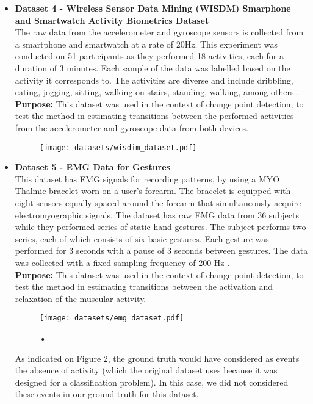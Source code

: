 \begin{itemize}
\item \textbf{Dataset 4 - Wireless Sensor Data Mining (WISDM) Smarphone and Smartwatch Activity Biometrics Dataset}\\
The raw data from the accelerometer and gyroscope sensors is collected from a smartphone and smartwatch at a rate of 20Hz. This experiment was conducted on 51 participants as they performed 18 activities, each for a duration of 3 minutes. Each sample of the data was labelled based on the activity it corresponds to. The activities are diverse and include dribbling, eating, jogging, sitting, walking on stairs, standing, walking, among others \cite{dataset4}.\\
\textbf{Purpose:} This dataset was used in the context of change point detection, to test the method in estimating transitions between the performed activities from the accelerometer and gyroscope data from both devices.

\begin{figure}
\centering
\texttt{[image: datasets/wisdim\_dataset.pdf]}
\caption{}
\label{fig:wisdim_data}
\end{figure}


    
\item \textbf{Dataset 5 - EMG Data for Gestures}\\
This dataset has EMG signals for recording patterns, by using a MYO Thalmic bracelet worn on a user's forearm. The bracelet is equipped with eight sensors equally spaced around the forearm that simultaneously acquire electromyographic signals. The dataset has raw EMG data from 36 subjects while they performed series of static hand gestures. The subject performs two series, each of which consists of six basic gestures. Each gesture was performed for 3 seconds with a pause of 3 seconds between gestures. The data was collected with a fixed sampling frequency of 200 Hz \cite{dataset5}.\\
\textbf{Purpose:} This dataset was used in the context of change point detection, to test the method in estimating transitions between the activation and relaxation of the muscular activity.

\begin{figure}
\centering
\texttt{[image: datasets/emg\_dataset.pdf]}
\caption{•}
\label{fig:emg_dataset}
\end{figure}


As indicated on Figure \ref{fig:emg_dataset}, the ground truth would have considered as events the absence of activity (which the original dataset uses because it was designed for a classification problem). In this case, we did not considered these events in our ground truth for this dataset.
    

\end{itemize}

